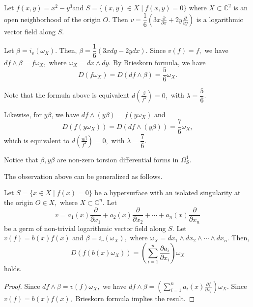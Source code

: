 \documentclass[pdftex]{arxsigma}
\begin{document}
\begin{example}
 Let $ f(x,y)=x^2-y^3 $and $ S=\{ (x,y) \in X \mid f(x,y)=0 \} $ where $ X \subset {\mathbb C}^2 $ is an open neighborhood of the origin $O$. Then $ v=\dfrac{1}{6}(3x\frac{\partial}{\partial x}+2y\frac{\partial}{\partial y}) $ is a logarithmic vector field along $ S$. 

Let $ \beta=i_v(\omega_X). $ Then, $ \beta=\dfrac{1}{6}(3xdy-2ydx). $
Since $v(f)=f, $ we have $ df \wedge \beta = f\omega_X, $ where $ \omega_X=dx \wedge dy. $
By Brieskorn formula, we have 
\begin{equation*}
D(f\omega_X) = D(df \wedge \beta) =\dfrac{5}{6}\omega_X. 
\end{equation*}

Note that the formula above is equivalent $ \displaystyle{d (\frac{\beta}{f^{\lambda}}) =0, } $ with $ \lambda = \dfrac{5}{6}. $


Likewise, for $ y\beta$, we have $ df \wedge (y\beta) = f (y\omega_X) $ and
\begin{equation*}
D(f(y\omega_X)) = D(df \wedge (y\beta)) = \dfrac{7}{6}\omega_X, 
\end{equation*}
which is equivalent to 
$ \displaystyle{d \left(\frac{y\beta}{f^{\lambda}}\right) =0, } $ with $ \lambda = \dfrac{7}{6}. $


Notice that $ \beta, y\beta$ are non-zero torsion differential forms in $ \Omega_S^{1}. $
\end{example}


The observation above can be generalized as follows.

\begin{proposition}
Let $ S=\{x  \in X \mid f(x)=0 \} $ be a hypersurface with an isolated singularity at the origin $O \in X, $ where $ X \subset {\mathbb C}^n. $ Let 
\begin{equation*}
v=a_1(x)\frac{\partial}{\partial x_1} + a_2(x)\frac{\partial}{\partial x_2}+ \cdots +a_n(x)\frac{\partial}{\partial x_n} 
\end{equation*}
be a germ of  non-trivial logarithmic vector field along $S. $
 Let
$ v(f) = b(x)f(x) $ and $ \beta=i_v(\omega_X), $ where $ \omega_X=dx_1 \wedge dx_2 \wedge \cdots \wedge dx_n. $
Then, 
\begin{equation*}
D(f(b(x)\omega_X)) = \left( \sum_{i=1}^{n} \frac{\partial a_i}{\partial x_i} \right) \omega_X 
\end{equation*}
holds.
\end{proposition}
\begin{proof}
Since $ df \wedge \beta = v(f) \omega_X,  $ we have $\displaystyle  df \wedge \beta = \left( \sum_{i=1}^{n} a_i(x)\frac{\partial f}{\partial x_i} \right)\omega_X. $ Since $ v(f) =b(x)f(x), $ Brieskorn formula implies the result.
\end{proof}
\end{document}
